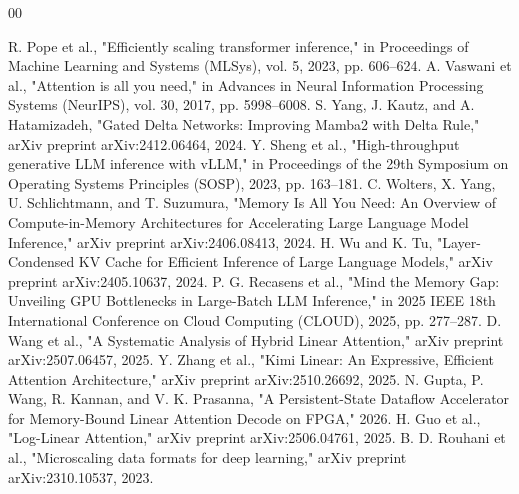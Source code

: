 ﻿\documentclass[conference]{IEEEtran}
\begin{document}
\begin{thebibliography}{00}

 R. Pope et al., "Efficiently scaling transformer inference," in Proceedings of Machine Learning and Systems (MLSys), vol. 5, 2023, pp. 606--624.
 A. Vaswani et al., "Attention is all you need," in Advances in Neural Information Processing Systems (NeurIPS), vol. 30, 2017, pp. 5998--6008.
 S. Yang, J. Kautz, and A. Hatamizadeh, "Gated Delta Networks: Improving Mamba2 with Delta Rule," arXiv preprint arXiv:2412.06464, 2024.
 Y. Sheng et al., "High-throughput generative LLM inference with vLLM," in Proceedings of the 29th Symposium on Operating Systems Principles (SOSP), 2023, pp. 163--181.
 C. Wolters, X. Yang, U. Schlichtmann, and T. Suzumura, "Memory Is All You Need: An Overview of Compute-in-Memory Architectures for Accelerating Large Language Model Inference," arXiv preprint arXiv:2406.08413, 2024.
 H. Wu and K. Tu, "Layer-Condensed KV Cache for Efficient Inference of Large Language Models," arXiv preprint arXiv:2405.10637, 2024.
 P. G. Recasens et al., "Mind the Memory Gap: Unveiling GPU Bottlenecks in Large-Batch LLM Inference," in 2025 IEEE 18th International Conference on Cloud Computing (CLOUD), 2025, pp. 277--287.
 D. Wang et al., "A Systematic Analysis of Hybrid Linear Attention," arXiv preprint arXiv:2507.06457, 2025.
 Y. Zhang et al., "Kimi Linear: An Expressive, Efficient Attention Architecture," arXiv preprint arXiv:2510.26692, 2025.
 N. Gupta, P. Wang, R. Kannan, and V. K. Prasanna, "A Persistent-State Dataflow Accelerator for Memory-Bound Linear Attention Decode on FPGA," 2026.
 H. Guo et al., "Log-Linear Attention," arXiv preprint arXiv:2506.04761, 2025.
 B. D. Rouhani et al., "Microscaling data formats for deep learning," arXiv preprint arXiv:2310.10537, 2023.

\end{thebibliography}
\end{document}
